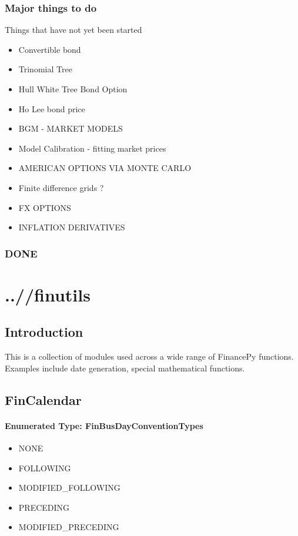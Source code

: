 \documentclass[twoside,11pt]{book}
\begin{document}
\subsection{Major things to do}
Things that have not yet been started
\begin{itemize}
\item Convertible bond
\item Trinomial Tree
\item Hull White Tree Bond Option
\item Ho Lee bond price
\item BGM - MARKET MODELS
\item Model Calibration - fitting market prices
\item AMERICAN OPTIONS VIA MONTE CARLO
\item Finite difference grids ?
\item FX OPTIONS
\item INFLATION DERIVATIVES
\end{itemize}

\subsection{DONE}

\chapter{..//finutils}
\section{Introduction}
This is a collection of modules used across a wide range of FinancePy functions. Examples include date generation, special mathematical functions.
\newpage
\section{FinCalendar}

\subsubsection{Enumerated Type: FinBusDayConventionTypes}
\begin{itemize}
\item{NONE}
\item{FOLLOWING}
\item{MODIFIED\_FOLLOWING}
\item{PRECEDING}
\item{MODIFIED\_PRECEDING}
\end{itemize}
\end{document}
